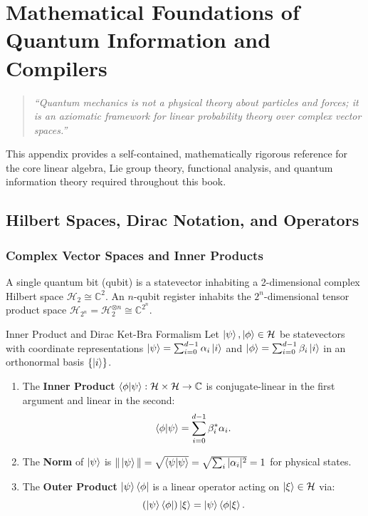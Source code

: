 \chapter{Mathematical Foundations of Quantum Information and Compilers}
\label{app:math_foundations}

\begin{quote}
\textit{``Quantum mechanics is not a physical theory about particles and forces; it is an axiomatic framework for linear probability theory over complex vector spaces.''}
\end{quote}

This appendix provides a self-contained, mathematically rigorous reference for the core linear algebra, Lie group theory, functional analysis, and quantum information theory required throughout this book.

\section{Hilbert Spaces, Dirac Notation, and Operators}
\label{sec:app_hilbert_spaces}

\subsection{Complex Vector Spaces and Inner Products}
A single quantum bit (qubit) is a statevector inhabiting a 2-dimensional complex Hilbert space $\mathcal{H}_2 \cong \mathbb{C}^2$. An $n$-qubit register inhabits the $2^n$-dimensional tensor product space $\mathcal{H}_{2^n} = \mathcal{H}_2^{\otimes n} \cong \mathbb{C}^{2^n}$.

\begin{definitionbox}{Inner Product and Dirac Ket-Bra Formalism}
Let $\ket{\psi}, \ket{\phi} \in \mathcal{H}$ be statevectors with coordinate representations $\ket{\psi} = \sum_{i=0}^{d-1} \alpha_i \ket{i}$ and $\ket{\phi} = \sum_{i=0}^{d-1} \beta_i \ket{i}$ in an orthonormal basis $\{\ket{i}\}$.
\begin{enumerate}
    \item The \textbf{Inner Product} $\braket{\phi|\psi}: \mathcal{H} \times \mathcal{H} \to \mathbb{C}$ is conjugate-linear in the first argument and linear in the second:
    \begin{equation}
        \braket{\phi|\psi} = \sum_{i=0}^{d-1} \beta_i^* \alpha_i.
    \end{equation}
    \item The \textbf{Norm} of $\ket{\psi}$ is $\|\ket{\psi}\| = \sqrt{\braket{\psi|\psi}} = \sqrt{\sum_i |\alpha_i|^2} = 1$ for physical states.
    \item The \textbf{Outer Product} $\ket{\psi}\bra{\phi}$ is a linear operator acting on $\ket{\xi} \in \mathcal{H}$ via:
    \begin{equation}
        (\ket{\psi}\bra{\phi}) \ket{\xi} = \ket{\psi} \braket{\phi|\xi}.
    \end{equation}
\end{enumerate}
\end{definitionbox}

